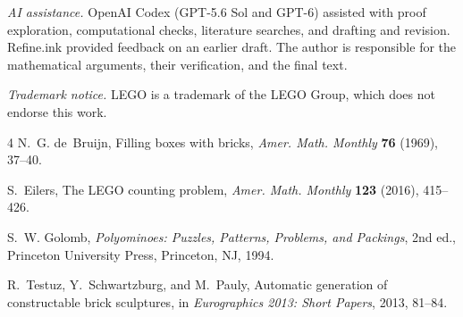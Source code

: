\documentclass[10pt,reqno]{amsart}
\begin{document}
\smallskip
\noindent\textit{AI assistance.}
OpenAI Codex (GPT-5.6 Sol and GPT-6) assisted with proof exploration,
computational checks, literature searches, and drafting and revision.
Refine.ink provided feedback on an earlier draft. The author is
responsible for the mathematical arguments, their verification, and
the final text.

\smallskip
\noindent\textit{Trademark notice.}
LEGO is a trademark of the LEGO Group, which does not endorse this work.

\begin{thebibliography}{4}
N.~G. de~Bruijn, Filling boxes with bricks,
\emph{Amer. Math. Monthly} \textbf{76} (1969), 37--40.

S.~Eilers, The LEGO counting problem,
\emph{Amer. Math. Monthly} \textbf{123} (2016), 415--426.

S.~W. Golomb, \emph{Polyominoes: Puzzles, Patterns, Problems, and Packings},
2nd ed., Princeton University Press, Princeton, NJ, 1994.

R.~Testuz, Y.~Schwartzburg, and M.~Pauly,
Automatic generation of constructable brick sculptures,
in \emph{Eurographics 2013: Short Papers}, 2013, 81--84.
\end{thebibliography}
\end{document}
